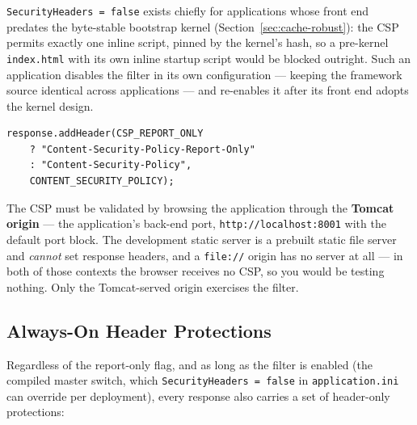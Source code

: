 \noindent
\texttt{SecurityHeaders = false} exists chiefly for applications whose front end predates the byte-stable bootstrap kernel (Section~\ref{sec:cache-robust}): the CSP permits exactly one inline script, pinned by the kernel's hash, so a pre-kernel \texttt{index.html} with its own inline startup script would be blocked outright.  Such an application disables the filter in its own configuration --- keeping the framework source identical across applications --- and re-enables it after its front end adopts the kernel design.

\begin{lstlisting}[style=java]
response.addHeader(CSP_REPORT_ONLY
    ? "Content-Security-Policy-Report-Only"
    : "Content-Security-Policy",
    CONTENT_SECURITY_POLICY);
\end{lstlisting}

\begin{warnbox}
The CSP must be validated by browsing the application through the \textbf{Tomcat origin} --- the application's back-end port, \texttt{http://localhost:8001} with the default port block.  The development static server is a prebuilt static file server and \emph{cannot} set response headers, and a \texttt{file://} origin has no server at all --- in both of those contexts the browser receives no CSP, so you would be testing nothing.  Only the Tomcat-served origin exercises the filter.
\end{warnbox}

\subsection{Always-On Header Protections}
\label{sec:security-headers}

Regardless of the report-only flag, and as long as the filter is enabled (the compiled master switch, which \texttt{SecurityHeaders = false} in \texttt{application.ini} can override per deployment), every response also carries a set of header-only protections:

